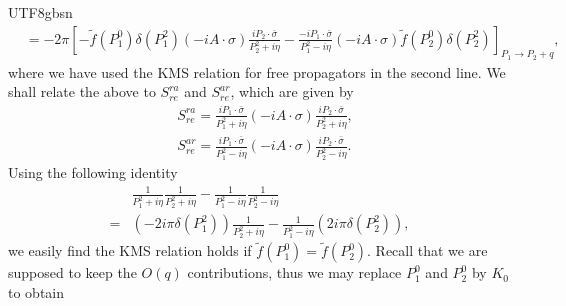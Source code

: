 \documentclass[11pt]{article}\def\baselinestretch{1.4}
\def\d{{\delta}}
\def\h{\eta}
\def\p{{\pi}}
\def\s{{\sigma}}
\def\({\left(}
\def\){\right)}
\begin{document}
\begin{CJK}{UTF8}{gbsn}
\begin{align}
&=-2\p\left[-\tilde{f}(P_1^0)\d(P_1^2)(-iA\cdot \sigma )\frac{iP_2\cdot \bar{\sigma }}{P_2^2+i \eta }-\frac{-iP_1\cdot \bar{\sigma }}{P_1^2-i \eta }(-iA\cdot \sigma )\tilde{f}(P_2^0)\d(P_2^2)\right]_{P_1\to P_2+q},
\end{align}
where we have used the KMS relation for free propagators in the second line.
We shall relate the above to $S_{re}^{ra}$ and $S_{re}^{ar}$, which are given by
\begin{align}
&S_{re}^{ra}=\frac{iP_1\cdot\bar{\s}}{P_1^2+i\h}(-iA\cdot\s)\frac{iP_2\cdot\bar{\s}}{P_2^2+i\h},\nonumber\\
&S_{re}^{ar}=\frac{iP_1\cdot\bar{\s}}{P_1^2-i\h}(-iA\cdot\s)\frac{iP_2\cdot\bar{\s}}{P_2^2-i\h}.
\end{align}
Using the following identity
\begin{align}
&\frac{1}{P_1^2+i\h}\frac{1}{P_2^2+i\h}-\frac{1}{P_1^2-i\h}\frac{1}{P_2^2-i\h}\nonumber\\
=&\(-2i\p\d(P_1^2)\)\frac{1}{P_2^2+i\h}-\frac{1}{P_1^2-i\h}\(2i\p\d(P_2^2)\),
\end{align}
we easily find the KMS relation holds if $\tilde{f}(P_1^0)=\tilde{f}(P_2^0)$. Recall that we are supposed to keep the $O(q)$ contributions, thus we may replace $P_1^0$ and $P_2^0$ by $K_0$ to obtain

\end{CJK}
\end{document}
